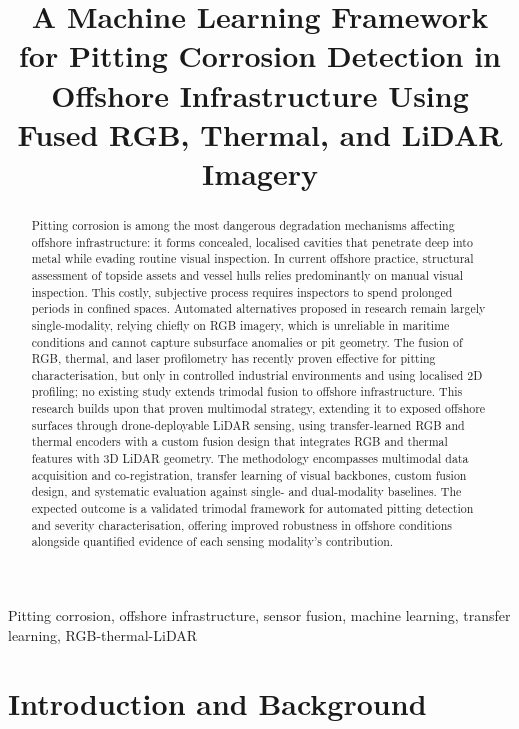 \documentclass[conference]{IEEEtran}
\title{A Machine Learning Framework for Pitting Corrosion Detection in Offshore Infrastructure Using Fused RGB, Thermal, and LiDAR Imagery}
\author{\IEEEauthorblockN{Victor Akhihiero}
\IEEEauthorblockA{\textit{Department of Chemical Engineering} \\
\textit{Universiti Teknologi PETRONAS}\\
victor\_26004080@utp.edu.my
}}
\begin{document}
\maketitle

\begin{abstract}
    Pitting corrosion is among the most dangerous degradation mechanisms affecting offshore infrastructure: it forms concealed, localised cavities that penetrate deep into metal while evading routine visual inspection. In current offshore practice, structural assessment of topside assets and vessel hulls relies predominantly on manual visual inspection. This costly, subjective process requires inspectors to spend prolonged periods in confined spaces. Automated alternatives proposed in research remain largely single-modality, relying chiefly on RGB imagery, which is unreliable in maritime conditions and cannot capture subsurface anomalies or pit geometry. The fusion of RGB, thermal, and laser profilometry has recently proven effective for pitting characterisation, but only in controlled industrial environments and using localised 2D profiling; no existing study extends trimodal fusion to offshore infrastructure. This research builds upon that proven multimodal strategy, extending it to exposed offshore surfaces through drone-deployable LiDAR sensing, using transfer-learned RGB and thermal encoders with a custom fusion design that integrates RGB and thermal features with 3D LiDAR geometry. The methodology encompasses multimodal data acquisition and co-registration, transfer learning of visual backbones, custom fusion design, and systematic evaluation against single- and dual-modality baselines. The expected outcome is a validated trimodal framework for automated pitting detection and severity characterisation, offering improved robustness in offshore conditions alongside quantified evidence of each sensing modality's contribution.
\end{abstract}


\begin{IEEEkeywords}
    Pitting corrosion, offshore infrastructure, sensor fusion, machine learning, transfer learning, RGB-thermal-LiDAR
\end{IEEEkeywords}

\section{Introduction and Background}
\end{document}
